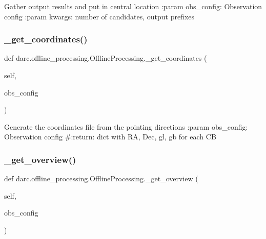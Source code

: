 \begin{DoxyVerb}Gather output results and put in central location
:param obs_config: Observation config
:param kwargs: number of candidates, output prefixes
\end{DoxyVerb}
 \mbox{\label{classdarc_1_1offline__processing_1_1_offline_processing_abffc70755e8cc6a67c4b4475e35fe18f}} 
\subsubsection{\texorpdfstring{\_get\_coordinates()}{\_get\_coordinates()}}
{\footnotesize\ttfamily def darc.\+offline\+\_\+processing.\+Offline\+Processing.\+\_\+get\+\_\+coordinates (\begin{DoxyParamCaption}\item[{}]{self,  }\item[{}]{obs\+\_\+config }\end{DoxyParamCaption})\hspace{0.3cm}{\ttfamily [private]}}

\begin{DoxyVerb}Generate the coordinates file from the pointing directions
:param obs_config: Observation config
#:return: dict with RA, Dec, gl, gb for each CB
\end{DoxyVerb}
 \mbox{\label{classdarc_1_1offline__processing_1_1_offline_processing_a4a5ed630ad941ee39f1dace63afabee0}} 
\subsubsection{\texorpdfstring{\_get\_overview()}{\_get\_overview()}}
{\footnotesize\ttfamily def darc.\+offline\+\_\+processing.\+Offline\+Processing.\+\_\+get\+\_\+overview (\begin{DoxyParamCaption}\item[{}]{self,  }\item[{}]{obs\+\_\+config }\end{DoxyParamCaption})\hspace{0.3cm}{\ttfamily [private]}}

